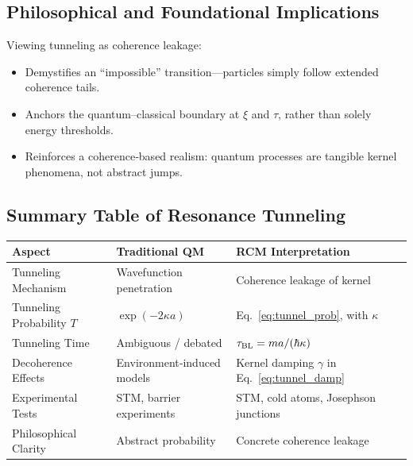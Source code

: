 \subsection{Philosophical and Foundational Implications}

Viewing tunneling as coherence leakage:
\begin{itemize}
  \item Demystifies an “impossible” transition—particles simply follow extended coherence tails.  
  \item Anchors the quantum–classical boundary at $\xi$ and $\tau$, rather than solely energy thresholds.  
  \item Reinforces a coherence‐based realism: quantum processes are tangible kernel phenomena, not abstract jumps.
\end{itemize}

\subsection{Summary Table of Resonance Tunneling}

\begin{center}
\begin{tabular}{|l|l|l|}
\hline
\textbf{Aspect}             & \textbf{Traditional QM}                 & \textbf{RCM Interpretation}                     \\ \hline
Tunneling Mechanism         & Wavefunction penetration                & Coherence leakage of kernel                    \\ \hline
Tunneling Probability $T$   & $\exp(-2\kappa a)$                      & Eq.~\eqref{eq:tunnel_prob}, with $\kappa$      \\ \hline
Tunneling Time              & Ambiguous / debated                     & $\tau_{\rm BL}=m a/(\hbar\kappa)$              \\ \hline
Decoherence Effects         & Environment‐induced models              & Kernel damping $\gamma$ in Eq.~\eqref{eq:tunnel_damp} \\ \hline
Experimental Tests          & STM, barrier experiments                & STM, cold atoms, Josephson junctions            \\ \hline
Philosophical Clarity       & Abstract probability                    & Concrete coherence leakage                     \\ \hline
\end{tabular}
\end{center}

